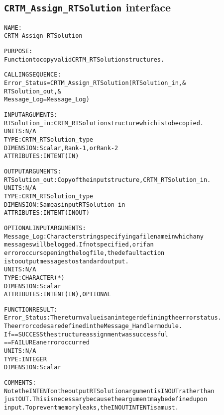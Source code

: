\subsection{\texttt{CRTM\_Assign\_RTSolution} interface}
  \label{sec:CRTM_Assign_RTSolution_interface}
  \begin{alltt}
 
  NAME:
        CRTM_Assign_RTSolution
 
  PURPOSE:
        Function to copy valid CRTM_RTSolution structures.
 
  CALLING SEQUENCE:
        Error_Status = CRTM_Assign_RTSolution( RTSolution_in          , &
                                               RTSolution_out         , &
                                               Message_Log=Message_Log  )
 
  INPUT ARGUMENTS:
        RTSolution_in:   CRTM_RTSolution structure which is to be copied.
                         UNITS:      N/A
                         TYPE:       CRTM_RTSolution_type
                         DIMENSION:  Scalar, Rank-1, or Rank-2
                         ATTRIBUTES: INTENT(IN)
 
  OUTPUT ARGUMENTS:
        RTSolution_out:  Copy of the input structure, CRTM_RTSolution_in.
                         UNITS:      N/A
                         TYPE:       CRTM_RTSolution_type
                         DIMENSION:  Same as input RTSolution_in
                         ATTRIBUTES: INTENT(IN OUT)
 
 
  OPTIONAL INPUT ARGUMENTS:
        Message_Log:     Character string specifying a filename in which any
                         messages will be logged. If not specified, or if an
                         error occurs opening the log file, the default action
                         is to output messages to standard output.
                         UNITS:      N/A
                         TYPE:       CHARACTER(*)
                         DIMENSION:  Scalar
                         ATTRIBUTES: INTENT(IN), OPTIONAL
 
  FUNCTION RESULT:
        Error_Status:    The return value is an integer defining the error status.
                         The error codes are defined in the Message_Handler module.
                         If == SUCCESS the structure assignment was successful
                            == FAILURE an error occurred
                         UNITS:      N/A
                         TYPE:       INTEGER
                         DIMENSION:  Scalar
 
  COMMENTS:
        Note the INTENT on the output RTSolution argument is IN OUT rather than
        just OUT. This is necessary because the argument may be defined upon
        input. To prevent memory leaks, the IN OUT INTENT is a must.
 
  \end{alltt}
